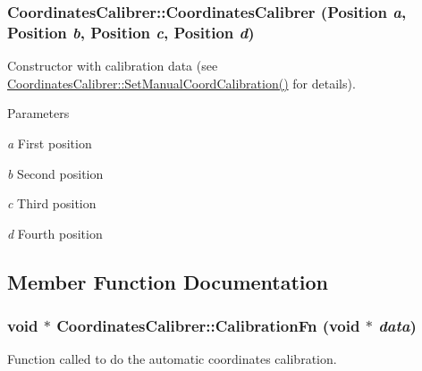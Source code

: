 \hypertarget{classCoordinatesCalibrer_a3b6304945fa64ac97a1b0bbc78753155}{
\subsubsection[{CoordinatesCalibrer}]{\setlength{\rightskip}{0pt plus 5cm}CoordinatesCalibrer::CoordinatesCalibrer (Position {\em a}, \/  Position {\em b}, \/  Position {\em c}, \/  Position {\em d})}}
\label{classCoordinatesCalibrer_a3b6304945fa64ac97a1b0bbc78753155}


Constructor with calibration data (see \hyperlink{classCoordinatesCalibrer_a006c18905b14e4780b9fc74fe26649fc}{CoordinatesCalibrer::SetManualCoordCalibration()} for details). 


\begin{DoxyParams}{Parameters}
\item[{\em a}]First position \item[{\em b}]Second position \item[{\em c}]Third position \item[{\em d}]Fourth position \end{DoxyParams}


\subsection{Member Function Documentation}
\hypertarget{classCoordinatesCalibrer_a4ce4c153ae8c3e50faccfba40e6bc4ea}{
\subsubsection[{CalibrationFn}]{\setlength{\rightskip}{0pt plus 5cm}void $\ast$ CoordinatesCalibrer::CalibrationFn (void $\ast$ {\em data})}}
\label{classCoordinatesCalibrer_a4ce4c153ae8c3e50faccfba40e6bc4ea}


Function called to do the automatic coordinates calibration. 


